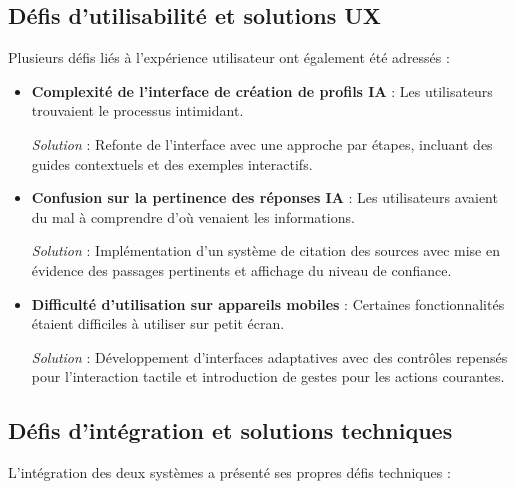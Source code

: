 \subsection{Défis d'utilisabilité et solutions UX}

Plusieurs défis liés à l'expérience utilisateur ont également été adressés :

\begin{itemize}
  \item \textbf{Complexité de l'interface de création de profils IA} : Les utilisateurs trouvaient le processus intimidant.
  
  \textit{Solution} : Refonte de l'interface avec une approche par étapes, incluant des guides contextuels et des exemples interactifs.
  
  \item \textbf{Confusion sur la pertinence des réponses IA} : Les utilisateurs avaient du mal à comprendre d'où venaient les informations.
  
  \textit{Solution} : Implémentation d'un système de citation des sources avec mise en évidence des passages pertinents et affichage du niveau de confiance.
  
  \item \textbf{Difficulté d'utilisation sur appareils mobiles} : Certaines fonctionnalités étaient difficiles à utiliser sur petit écran.
  
  \textit{Solution} : Développement d'interfaces adaptatives avec des contrôles repensés pour l'interaction tactile et introduction de gestes pour les actions courantes.
\end{itemize}

\subsection{Défis d'intégration et solutions techniques}

L'intégration des deux systèmes a présenté ses propres défis techniques :

